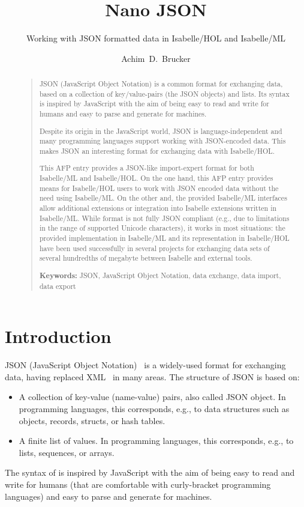 \documentclass[11pt,DIV=12,a4paper,abstract=true,twoside=semi,openright]
{scrreprt}
\title{Nano JSON}
\subtitle{Working with JSON formatted data in Isabelle/HOL and Isabelle/ML}
\author{Achim~D.~Brucker}%
\begin{document}
  \maketitle
  \begin{abstract}
    \begin{quote}
      JSON (JavaScript Object Notation) is a common format for exchanging data,
      based on a collection of key/value-pairs (the JSON objects) and lists. Its
      syntax is inspired by JavaScript with the aim of being easy to read and
      write for humans and easy to parse and generate for machines. 
  
      Despite its origin in the JavaScript world, JSON is language-independent
      and many programming languages support working with JSON-encoded data.
      This makes JSON an interesting format for exchanging data with
      Isabelle/HOL.
 
      This AFP entry provides a JSON-like import-expert format for both
      Isabelle/ML and Isabelle/HOL. On the one hand, this AFP entry provides
      means for Isabelle/HOL users to work with JSON encoded data without the
      need using Isabelle/ML. On the other and, the provided Isabelle/ML
      interfaces allow additional extensions or integration into Isabelle
      extensions written in Isabelle/ML. While format is not fully JSON
      compliant (e.g., due to limitations in the range of supported Unicode
      characters), it works in most situations: the provided implementation in
      Isabelle/ML and its representation in Isabelle/HOL have been used
      successfully in several projects for exchanging data sets of several
      hundredths of megabyte between Isabelle and external tools.

      \bigskip
      \noindent\textbf{Keywords:} JSON, JavaScript Object Notation, data
        exchange, data import, data export 
    \end{quote}
  \end{abstract}
\tableofcontents


\chapter{Introduction}
JSON (JavaScript Object Notation)~\cite{ecma:json:2017,ietf:rfc8259-json:2017}
is a widely-used format for exchanging data, having replaced
XML~\cite{bray.ea:extensible:2008} in many areas. The structure of JSON is based
on:
\begin{itemize}
\item A collection of key-value (name-value) pairs, also called JSON object. In
  programming languages, this corresponds, e.g., to data structures such as
  objects, records, structs, or hash tables. 
\item A finite list of values. In programming languages, this corresponds, e.g.,
  to lists, sequences, or arrays. 
\end{itemize}
The syntax of  is inspired by JavaScript with the aim of being easy to read and
write for humans (that are comfortable with curly-bracket programming languages)
and easy to parse and generate for machines. 
\end{document}
